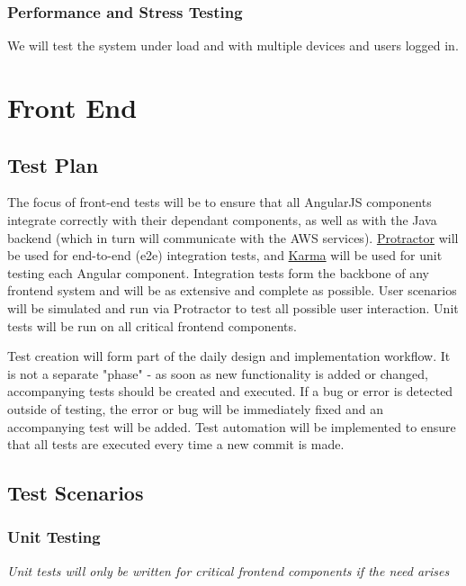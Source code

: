 \documentclass{article}
\begin{document}
		\subsubsection{Performance and Stress Testing}
			We will test the system under load and with multiple devices and users logged in.
		
\section{Front End}
	\subsection{Test Plan}
	The focus of front-end tests will be to ensure that all AngularJS components integrate correctly with their dependant components, as well as with the Java backend (which in turn will communicate with the AWS services). \href{http://www.protractortest.org/#/}{Protractor} will be used for end-to-end (e2e) integration tests, and \href{https://karma-runner.github.io/1.0/index.html}{Karma} will be used for unit testing each Angular component. Integration tests form the backbone of any frontend system and will be as extensive and complete as possible. User scenarios will be simulated and run via Protractor to test all possible user interaction. Unit tests will be run on all critical frontend components.
	
	Test creation will form part of the daily design and implementation workflow. It is not a separate "phase" - as soon as new functionality is added or changed, accompanying tests should be created and executed. If a bug or error is detected outside of testing, the error or bug will be immediately fixed and an accompanying test will be added. Test automation will be implemented to ensure that all tests are executed every time a new commit is made. 
		
	\subsection{Test Scenarios}
		\subsubsection{Unit Testing}
			\textit{Unit tests will only be written for critical frontend components if the need arises}
\end{document}
